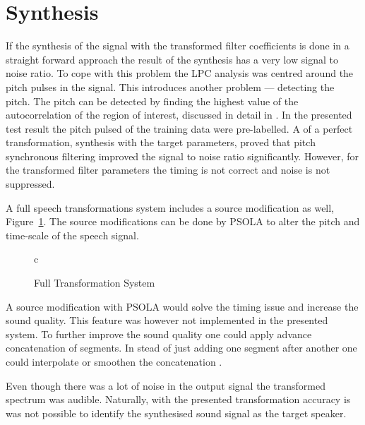 \section{Synthesis} %
\label{sec:synthesis}
If the synthesis of the signal with the transformed filter coefficients is done in a straight forward approach the result of the synthesis has a very low signal to noise ratio. To cope with this problem the LPC analysis was centred around the pitch pulses in the signal. This introduces another problem --- detecting the pitch. The pitch can be detected by finding the highest value of the autocorrelation of the region of interest, discussed in detail in \cite[p. 324]{taletek}. In the presented test result the pitch pulsed of the training data were pre-labelled. A of a perfect transformation, \ie synthesis with the target parameters, proved that pitch synchronous filtering improved the signal to noise ratio significantly. However, for the transformed filter parameters the timing is not correct and noise is not suppressed.

A full speech transformations system includes a source modification as well, Figure~\ref{fig:VC_full}. The source modifications can be done by PSOLA \cite[p.820]{taletek} to alter the pitch and time-scale  of the speech signal.
\begin{figure}[htbp]
  \centering
   \begin{tabular}[h]{c}
  \end{tabular}
  \caption{Full Transformation System}
  \label{fig:VC_full}
\end{figure}
A source modification with PSOLA would solve the timing issue and increase the sound quality. This feature was however not implemented in the presented system. To further improve the sound quality one could apply advance concatenation of segments. In stead of just adding one segment after another one could interpolate or smoothen the concatenation \cite{chappell02}.

Even though there was a lot of noise in the output signal the transformed spectrum was audible. Naturally, with the presented transformation accuracy is was not possible to identify the synthesised sound signal as the target speaker.


